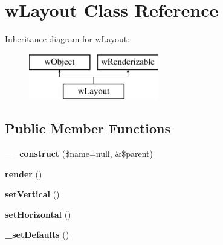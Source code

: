 \hypertarget{classwLayout}{
\section{wLayout Class Reference}
\label{classwLayout}
}
Inheritance diagram for wLayout:\begin{figure}[H]
\begin{center}
\leavevmode
\includegraphics[height=2.000000cm]{classwLayout}
\end{center}
\end{figure}
\subsection*{Public Member Functions}
\begin{DoxyCompactItemize}
\item 
\hypertarget{classwLayout_a4b4fc51c9a01962fb39dc592cf74e6ba}{
{\bfseries \_\-\_\-construct} (\$name=null, \&\$parent)}
\label{classwLayout_a4b4fc51c9a01962fb39dc592cf74e6ba}

\item 
\hypertarget{classwLayout_a1c6a3599d1a330751b9783fc80c46348}{
{\bfseries render} ()}
\label{classwLayout_a1c6a3599d1a330751b9783fc80c46348}

\item 
\hypertarget{classwLayout_a8709289f21a12d7e5ac56ff100bf819b}{
{\bfseries setVertical} ()}
\label{classwLayout_a8709289f21a12d7e5ac56ff100bf819b}

\item 
\hypertarget{classwLayout_ac41d433795bb46a3510b11decab6d05b}{
{\bfseries setHorizontal} ()}
\label{classwLayout_ac41d433795bb46a3510b11decab6d05b}

\item 
\hypertarget{classwLayout_a4ca5e81203648719bfe77f4934f7ada0}{
{\bfseries \_\-setDefaults} ()}
\label{classwLayout_a4ca5e81203648719bfe77f4934f7ada0}

\end{DoxyCompactItemize}
